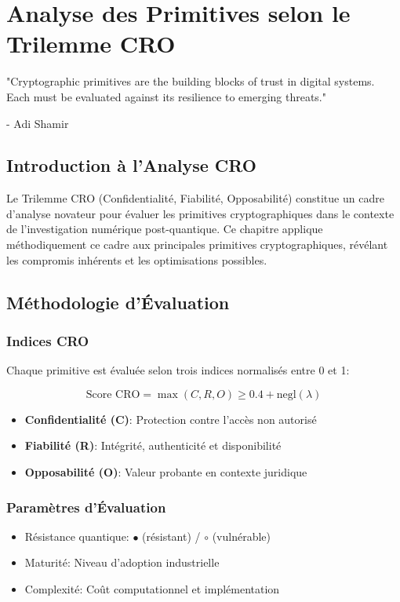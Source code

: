 \chapter{Analyse des Primitives selon le Trilemme CRO}
\epigraph{"Cryptographic primitives are the building blocks of trust in digital systems. Each must be evaluated against its resilience to emerging threats."}{- Adi Shamir}
\section{Introduction à l'Analyse CRO}
Le Trilemme CRO (Confidentialité, Fiabilité, Opposabilité) constitue un cadre d'analyse novateur pour évaluer les primitives cryptographiques dans le contexte de l'investigation numérique post-quantique. Ce chapitre applique méthodiquement ce cadre aux principales primitives cryptographiques, révélant les compromis inhérents et les optimisations possibles.

\section{Méthodologie d'Évaluation}
\subsection{Indices CRO}
Chaque primitive est évaluée selon trois indices normalisés entre 0 et 1:

\[
\text{Score CRO} = \max(C, R, O) \geq 0.4 + \text{negl}(\lambda)
\]

\begin{itemize}
\item \textbf{Confidentialité (C)}: Protection contre l'accès non autorisé
\item \textbf{Fiabilité (R)}: Intégrité, authenticité et disponibilité
\item \textbf{Opposabilité (O)}: Valeur probante en contexte juridique
\end{itemize}

\subsection{Paramètres d'Évaluation}
\begin{itemize}
\item Résistance quantique: \(\bullet\) (résistant) / \(\circ\) (vulnérable)
\item Maturité: Niveau d'adoption industrielle
\item Complexité: Coût computationnel et implémentation
\end{itemize}

